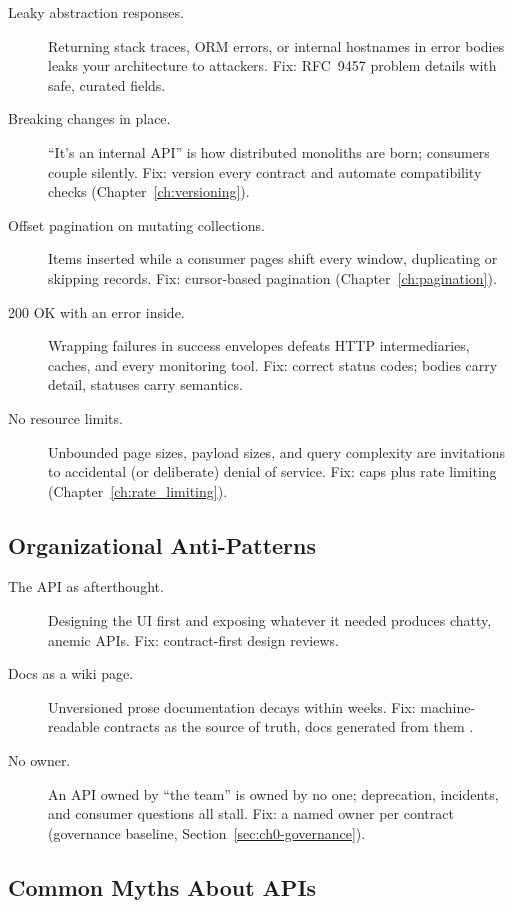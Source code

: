 \begin{description}
  \item[Leaky abstraction responses.] Returning stack traces, ORM errors, or
    internal hostnames in error bodies leaks your architecture to attackers.
    Fix: RFC~9457 problem details with safe, curated fields.
  \item[Breaking changes in place.] ``It's an internal API'' is how
    distributed monoliths are born; consumers couple silently. Fix: version
    every contract and automate compatibility checks
    (Chapter~\ref{ch:versioning}).
  \item[Offset pagination on mutating collections.] Items inserted while a
    consumer pages shift every window, duplicating or skipping records. Fix:
    cursor-based pagination (Chapter~\ref{ch:pagination}).
  \item[200 OK with an error inside.] Wrapping failures in success envelopes
    defeats HTTP intermediaries, caches, and every monitoring tool. Fix:
    correct status codes; bodies carry detail, statuses carry semantics.
  \item[No resource limits.] Unbounded page sizes, payload sizes, and query
    complexity are invitations to accidental (or deliberate) denial of
    service. Fix: caps plus rate limiting (Chapter~\ref{ch:rate_limiting}).
\end{description}

\subsection{Organizational Anti-Patterns}

\begin{description}
  \item[The API as afterthought.] Designing the UI first and exposing
    whatever it needed produces chatty, anemic APIs. Fix: contract-first
    design reviews.
  \item[Docs as a wiki page.] Unversioned prose documentation decays within
    weeks. Fix: machine-readable contracts as the source of truth, docs
    generated from them \cite{openapi31}.
  \item[No owner.] An API owned by ``the team'' is owned by no one;
    deprecation, incidents, and consumer questions all stall. Fix: a named
    owner per contract (governance baseline,
    Section~\ref{sec:ch0-governance}).
\end{description}

\subsection{Common Myths About APIs}
\label{sec:ch0-myths}

